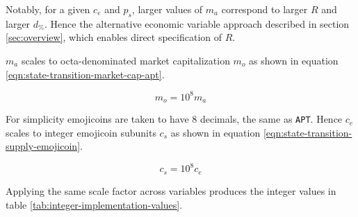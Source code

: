 \documentclass[table, twocolumn]{article}
\begin{document}
Notably, for a given $c_e$ and $p_s$, larger values of $m_a$ correspond to larger $R$
and larger $d_\%$. Hence the alternative economic variable approach described in section
\ref{sec:overview}, which enables direct specification of $R$.

$m_a$ scales to octa-denominated \cite{octa} market capitalization $m_o$ as shown in
equation \ref{eqn:state-transition-market-cap-apt}.

\begin{equation} \label{eqn:state-transition-market-cap-apt}
  m_o = 10^8 m_a
\end{equation}

For simplicity emojicoins are taken to have 8 decimals, the same as \texttt{APT}. Hence
$c_e$ scales to integer emojicoin subunits $c_s$ as shown in equation
\ref{eqn:state-transition-supply-emojicoin}.

\begin{equation} \label{eqn:state-transition-supply-emojicoin}
  c_s = 10^8 c_e
\end{equation}

Applying the same scale factor across variables produces the integer values in table
\ref{tab:integer-implementation-values}.
\end{document}

